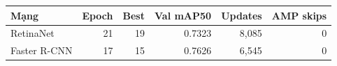 \begin{tabular}{lrrrrr}
\toprule
Mạng & Epoch & Best & Val mAP50 & Updates & AMP skips\\
\midrule
RetinaNet & 21 & 19 & 0.7323 & 8,085 & 0\\
Faster R-CNN & 17 & 15 & 0.7626 & 6,545 & 0\\
\bottomrule
\end{tabular}
